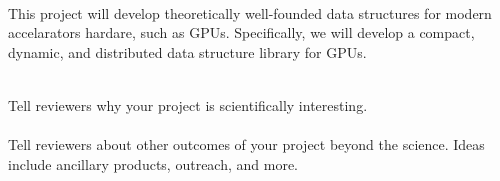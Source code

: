 

\\

\noindent This project will develop theoretically well-founded data structures for modern accelarators hardare, such as GPUs. Specifically, we will develop a compact, dynamic, and distributed data structure library for GPUs.


\\

\noindent Tell reviewers why your project is scientifically interesting.\\

\\

\noindent Tell reviewers about other outcomes of your project beyond the science. Ideas include ancillary products, outreach, and more.